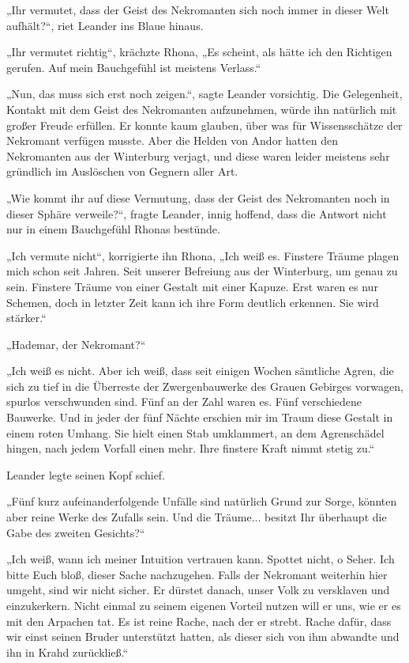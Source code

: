„Ihr vermutet, dass der Geist des Nekromanten sich noch immer in dieser Welt aufhält?“, riet Leander ins Blaue hinaus.

„Ihr vermutet richtig“, krächzte Rhona, „Es scheint, als hätte ich den Richtigen gerufen. Auf mein Bauchgefühl ist meistens Verlass.“

„Nun, das muss sich erst noch zeigen.“, sagte Leander vorsichtig. Die Gelegenheit, Kontakt mit dem Geist des Nekromanten aufzunehmen, würde ihn natürlich mit großer Freude erfüllen. Er konnte kaum glauben, über was für Wissensschätze der Nekromant verfügen musste. Aber die Helden von Andor hatten den Nekromanten aus der Winterburg verjagt, und diese waren leider meistens sehr gründlich im Auslöschen von Gegnern aller Art.

„Wie kommt ihr auf diese Vermutung, dass der Geist des Nekromanten noch in dieser Sphäre verweile?“, fragte Leander, innig hoffend, dass die Antwort nicht nur in einem Bauchgefühl Rhonas bestünde.

„Ich vermute nicht“, korrigierte ihn Rhona, „Ich weiß es. Finstere Träume plagen mich schon seit Jahren. Seit unserer Befreiung aus der Winterburg, um genau zu sein. Finstere Träume von einer Gestalt mit einer Kapuze. Erst waren es nur Schemen, doch in letzter Zeit kann ich ihre Form deutlich erkennen. Sie wird stärker.“

„Hademar, der Nekromant?“

„Ich weiß es nicht. Aber ich weiß, dass seit einigen Wochen sämtliche Agren, die sich zu tief in die Überreste der Zwergenbauwerke des Grauen Gebirges vorwagen, spurlos verschwunden sind. Fünf an der Zahl waren es. Fünf verschiedene Bauwerke. Und in jeder der fünf Nächte erschien mir im Traum diese Gestalt in einem roten Umhang. Sie hielt einen Stab umklammert, an dem Agrenschädel hingen, nach jedem Vorfall einen mehr. Ihre finstere Kraft nimmt stetig zu.“

Leander legte seinen Kopf schief.

„Fünf kurz aufeinanderfolgende Unfälle sind natürlich Grund zur Sorge, könnten aber reine Werke des Zufalls sein. Und die Träume... besitzt Ihr überhaupt die Gabe des zweiten Gesichts?“

„Ich weiß, wann ich meiner Intuition vertrauen kann. Spottet nicht, o Seher. Ich bitte Euch bloß, dieser Sache nachzugehen. Falls der Nekromant weiterhin hier umgeht, sind wir nicht sicher. Er dürstet danach, unser Volk zu versklaven und einzukerkern. Nicht einmal zu seinem eigenen Vorteil nutzen will er uns, wie er es mit den Arpachen tat. Es ist reine Rache, nach der er strebt. Rache dafür, dass wir einst seinen Bruder unterstützt hatten, als dieser sich von ihm abwandte und ihn in Krahd zurückließ.“

